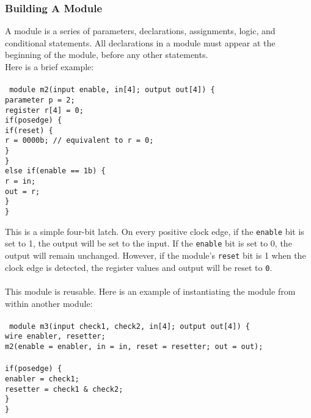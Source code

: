 \documentclass[letterpaper,11pt]{article}
\newcommand{\tab}{\hspace*{2em}}
\begin{document}
        \subsubsection{Building A Module}
        A module is a series of parameters, declarations, assignments, logic, and conditional statements. 
        All declarations in a module must appear at the beginning of the module, before any other statements.\\
        Here is a brief example:\\\\
        \texttt{
        module m2(input enable, in[4]; output out[4]) \{ \\
        \tab parameter p = 2;\\
        \tab register r[4] = 0; \\
        \tab if(posedge) \{ \\
        \tab\tab if(reset) \{ \\
        \tab\tab\tab r = 0000b; // equivalent to r = 0; \\
        \tab\tab \} \\
        \tab \} \\
        \tab else if(enable == 1b) \{ \\
        \tab\tab r = in; \\
        \tab\tab out = r; \\
        \tab\} \\
        \}}
        
        This is a simple four-bit latch. On every positive clock edge, if the \texttt{enable} bit is set to 1, 
        the output will be set to the input. If the \texttt{enable} bit is set to 0, the output will remain 
        unchanged. However, if the module's \texttt{reset} bit is 1 when the clock edge is detected, the 
        register values and output will be reset to \texttt{0}.\\\\
        This module is reusable. Here is an example of instantiating the module from within another module: \\\\
        \texttt{
        module m3(input check1, check2, in[4]; output out[4]) \{ \\
        \tab wire enabler, resetter; \\
        \tab m2(enable = enabler, in = in, reset = resetter; out = out); \\\\
        \tab if(posedge) \{ \\
        \tab\tab enabler = check1; \\
        \tab\tab resetter = check1 \& check2; \\
        \tab \}  \\
        \}}
        
\end{document}
